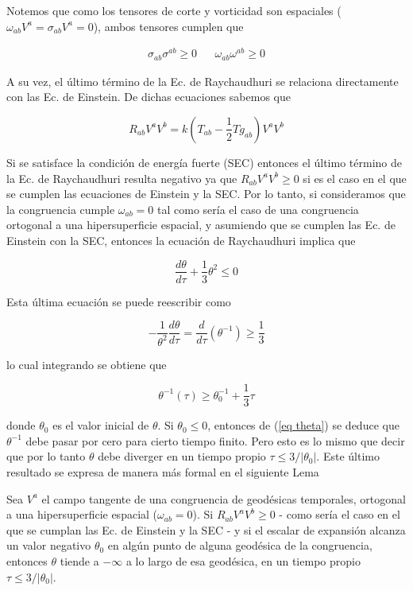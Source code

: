 Notemos que como los tensores de corte y vorticidad son espaciales ($\omega_{ab}V^a=\sigma_{ab}V^a=0$), ambos tensores cumplen que

\begin{align*}
    \sigma_{ab}\sigma^{ab}\geq0&  &\omega_{ab}\omega^{ab}\geq0
\end{align*}

A su vez, el último término de la Ec. de Raychaudhuri se relaciona directamente con las Ec. de Einstein. De dichas ecuaciones sabemos que

\begin{equation*}
    R_{ab}V^aV^b=k\left(T_{ab}-\frac{1}{2}Tg_{ab}\right)V^aV^b
\end{equation*}

Si se satisface la condición de energía fuerte (SEC) entonces el último término de la Ec. de Raychaudhuri resulta negativo ya que $R_{ab}V^aV^b\geq0$ si es el caso en el que se cumplen las ecuaciones de Einstein y la SEC. Por lo tanto, si consideramos que la congruencia cumple $\omega_{ab}=0$ tal como sería el caso de una congruencia ortogonal a una hipersuperficie espacial, y asumiendo que se cumplen las Ec. de Einstein con la SEC, entonces la ecuación de Raychaudhuri implica que

\[\frac{d\theta}{d\tau}+\frac{1}{3}\theta^2\leq0 \]


Esta última ecuación se puede reescribir como

\[-\frac{1}{\theta^2}\frac{d\theta}{d\tau}=\frac{d}{d\tau}(\theta^{-1})\geq\frac{1}{3} \]

lo cual integrando se obtiene que

\begin{equation}\label{eq theta}
     \theta^{-1}(\tau)\geq \theta_0^{-1}+\frac{1}{3}\tau
\end{equation}

donde $\theta_0$ es el valor inicial de $\theta$. Si $\theta_0\leq 0$, entonces de (\ref{eq theta}) se deduce que $\theta^{-1}$ debe pasar por cero para cierto tiempo finito. Pero esto es lo mismo que decir que por lo tanto $\theta$ debe diverger en un tiempo propio $\tau\leq3/|\theta_0|$. Este último resultado se expresa de manera más formal en el siguiente Lema

\begin{lemma}\label{lema Raychaudhuri}
Sea $V^a$ el campo tangente de una congruencia de geodésicas temporales, ortogonal a una hipersuperficie espacial ($\omega_{ab}=0$). Si $R_{ab}V^aV^b\geq0$ - como sería el caso en el que se cumplan las Ec. de Einstein y la SEC - y si el escalar de expansión alcanza un valor negativo $\theta_0$ en algún punto de alguna geodésica de la congruencia, entonces $\theta$ tiende a $-\infty$ a lo largo de esa geodésica, en un tiempo propio $\tau\leq3/|\theta_0|$.
\end{lemma}


